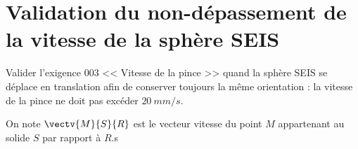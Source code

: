 \section{Validation du non-dépassement de la vitesse de la sphère SEIS}

\begin{obj}
Valider l’exigence 003 << Vitesse de la pince >> quand la sphère SEIS se déplace en 
translation afin de conserver toujours la même orientation : la vitesse de la pince ne doit pas excéder $\SI{20}{mm/s}$.
\end{obj}

On note $\vectv{M}{S}{R}$ est le vecteur vitesse du point $M$ appartenant au solide $S$ par rapport à $R$.s



